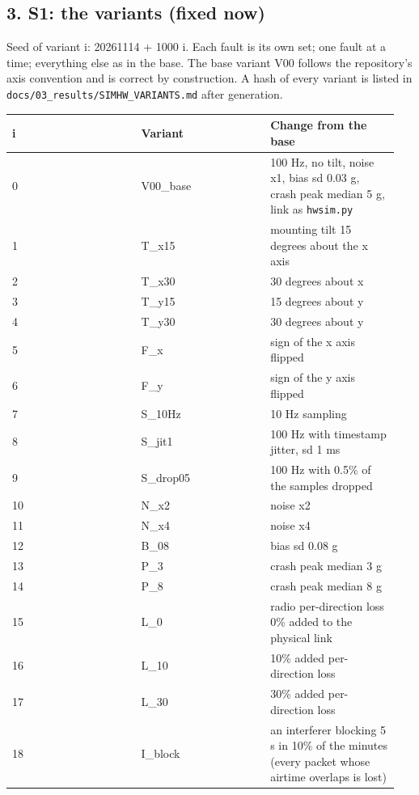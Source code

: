 \subsection*{3. S1: the variants (fixed now)}

Seed of variant i: 20261114 + 1000 i. Each fault is its own set; one fault at a time; everything else as in the base. The base variant V00 follows the repository's axis convention and is correct by construction. A hash of every variant is listed in \texttt{docs/03\_results/SIMHW\_VARIANTS.md} after generation.

{\scriptsize\raggedright
\begin{longtable}{p{0.317\linewidth}p{0.317\linewidth}p{0.317\linewidth}}
\toprule
i & Variant & Change from the base \\
\midrule
\endhead
0 & V00\_base & 100 Hz, no tilt, noise x1, bias sd 0.03 g, crash peak median 5 g, link as \texttt{hwsim.py} \\
1 & T\_x15 & mounting tilt 15 degrees about the x axis \\
2 & T\_x30 & 30 degrees about x \\
3 & T\_y15 & 15 degrees about y \\
4 & T\_y30 & 30 degrees about y \\
5 & F\_x & sign of the x axis flipped \\
6 & F\_y & sign of the y axis flipped \\
7 & S\_10Hz & 10 Hz sampling \\
8 & S\_jit1 & 100 Hz with timestamp jitter, sd 1 ms \\
9 & S\_drop05 & 100 Hz with 0.5\% of the samples dropped \\
10 & N\_x2 & noise x2 \\
11 & N\_x4 & noise x4 \\
12 & B\_08 & bias sd 0.08 g \\
13 & P\_3 & crash peak median 3 g \\
14 & P\_8 & crash peak median 8 g \\
15 & L\_0 & radio per-direction loss 0\% added to the physical link \\
16 & L\_10 & 10\% added per-direction loss \\
17 & L\_30 & 30\% added per-direction loss \\
18 & I\_block & an interferer blocking 5 s in 10\% of the minutes (every packet whose airtime overlaps is lost) \\
\bottomrule
\end{longtable}}

